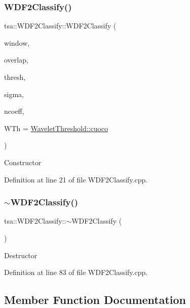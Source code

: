 \subsubsection{\texorpdfstring{W\+D\+F2\+Classify()}{WDF2Classify()}}
{\footnotesize\ttfamily tsa\+::\+W\+D\+F2\+Classify\+::\+W\+D\+F2\+Classify (\begin{DoxyParamCaption}\item[{unsigned int}]{window,  }\item[{unsigned int}]{overlap,  }\item[{double}]{thresh,  }\item[{double}]{sigma,  }\item[{unsigned int}]{ncoeff,  }\item[{enum \hyperlink{classtsa_1_1_wavelet_threshold_a50c42c95dae960986a985157ca038fae}{Wavelet\+Threshold\+::\+Wavelet\+Thresholding}}]{W\+Th = {\ttfamily \hyperlink{classtsa_1_1_wavelet_threshold_a50c42c95dae960986a985157ca038faea849b2c33799f9de0e842f1d935ea3822}{Wavelet\+Threshold\+::cuoco}} }\end{DoxyParamCaption})}

Constructor 

Definition at line 21 of file W\+D\+F2\+Classify.\+cpp.

\mbox{\label{classtsa_1_1_w_d_f2_classify_aca93650a5449192353412584c67102eb}} 
\subsubsection{\texorpdfstring{$\sim$\+W\+D\+F2\+Classify()}{~WDF2Classify()}}
{\footnotesize\ttfamily tsa\+::\+W\+D\+F2\+Classify\+::$\sim$\+W\+D\+F2\+Classify (\begin{DoxyParamCaption}{ }\end{DoxyParamCaption})}

Destructor 

Definition at line 83 of file W\+D\+F2\+Classify.\+cpp.



\subsection{Member Function Documentation}
\mbox{\label{classtsa_1_1_w_d_f2_classify_a0f6ec6f4e5ef234dd2035f38d7cccadc}} 
